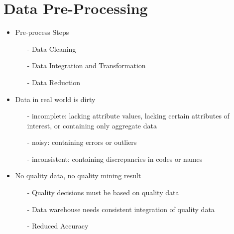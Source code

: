 \section{Data Pre-Processing}\label{sec:obj}
\begin{itemize}
   \item Pre-process Steps
   \begin{itemize}
     \item[-] Data Cleaning
     \item[-] Data Integration and Transformation
     \item[-] Data Reduction
   \end{itemize}
   \item Data in real world is dirty 
   \begin{itemize}
     \item[-]incomplete: lacking attribute values, lacking certain attributes of interest, or containing only aggregate data
     \item[-] noisy: containing errors or outliers
     \item[-] inconsistent: containing discrepancies in codes or names
    
   \end{itemize}
   \item No quality data, no quality mining result
   \begin{itemize}
     \item[-] Quality decisions must be based on quality data
     \item[-] Data warehouse needs consistent integration of quality data
     \item[-] Reduced Accuracy
    \end{itemize}
\end{itemize}

